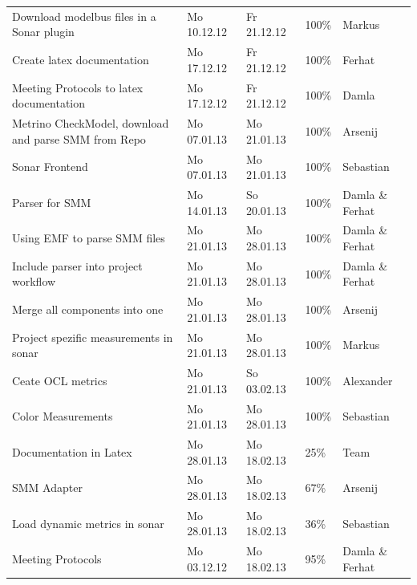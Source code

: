 \begin{longtable}{|p{6cm}|p{2.5cm}|p{2.5cm}|p{1.7cm}|p{1.8cm}|}
Download modelbus files in a Sonar plugin & Mo 10.12.12 & Fr 21.12.12 & 100\% & Markus \\ 
Create latex documentation & Mo 17.12.12 & Fr 21.12.12 & 100\% & Ferhat \\ 
Meeting Protocols to latex documentation & Mo 17.12.12 & Fr 21.12.12 & 100\% & Damla \\ 
Metrino CheckModel, download and parse SMM from Repo & Mo 07.01.13 & Mo 21.01.13 & 100\% & Arsenij \\ 
Sonar Frontend & Mo 07.01.13 & Mo 21.01.13 & 100\% & Sebastian \\ 
Parser for SMM & Mo 14.01.13 & So 20.01.13 & 100\% & Damla \& Ferhat \\ 
Using EMF to parse SMM files & Mo 21.01.13 & Mo 28.01.13 & 100\% & Damla \& Ferhat \\
Include parser into project workflow & Mo 21.01.13 & Mo 28.01.13 & 100\% & Damla \& Ferhat \\ 
Merge all components into one & Mo 21.01.13 & Mo 28.01.13 & 100\% & Arsenij \\ 
Project spezific measurements in sonar & Mo 21.01.13 & Mo 28.01.13 & 100\% & Markus \\ 
Ceate OCL metrics & Mo 21.01.13 & So 03.02.13 & 100\% & Alexander \\ 
Color Measurements & Mo 21.01.13 & Mo 28.01.13 & 100\% & Sebastian \\ 
Documentation in Latex & Mo 28.01.13 & Mo 18.02.13 & 25\% & Team \\ 
SMM Adapter & Mo 28.01.13 & Mo 18.02.13 & 67\% & Arsenij \\ 
Load dynamic metrics in sonar & Mo 28.01.13 & Mo 18.02.13 & 36\% & Sebastian \\ 
Meeting Protocols & Mo 03.12.12 & Mo 18.02.13 & 95\% & Damla \& Ferhat \\
\hline
\end{longtable}

\newpage

